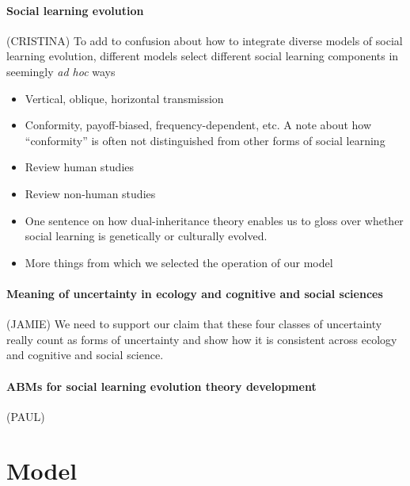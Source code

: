 \documentclass[letterpaper,11.5pt]{scrartcl}
\begin{document}
\paragraph{Social learning evolution} (CRISTINA)
To add to confusion about how to integrate diverse models of social learning
evolution, different models select different social learning components in
seemingly \emph{ad hoc} ways 
\begin{itemize}
  \item 
    Vertical, oblique, horizontal transmission
  \item
    Conformity, payoff-biased, frequency-dependent, etc. A note about how
    ``conformity'' is often not distinguished from other forms of social learning
  \item
    Review human studies
  \item
    Review non-human studies~\cite{Leris2016,Aplin2017,Avargues-Weber2018,Baracchi2018}
  \item
    One sentence on how dual-inheritance theory enables us to gloss over whether
    social learning is genetically or culturally evolved.
  \item
    More things from which we selected the operation of our model
\end{itemize}

\paragraph{Meaning of uncertainty in ecology and cognitive and social sciences} (JAMIE)
We need to support our claim that these four classes of uncertainty really 
count as forms of uncertainty and show how it is consistent across ecology and
cognitive and social science.

\paragraph{ABMs for social learning evolution theory development} (PAUL)


\section{Model}
\end{document}
